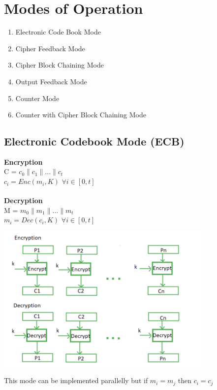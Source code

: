 \documentclass[11pt]{article}
\begin{document}
\section*{Modes of Operation}
\begin{enumerate}
\itemsep-0.5em 
\item Electronic Code Book Mode
\item Cipher Feedback Mode
\item Cipher Block Chaining Mode
\item Output Feedback Mode
\item Counter Mode
\item Counter with Cipher Block Chaining Mode
\end{enumerate}

\subsection*{Electronic Codebook Mode (ECB)}
\textbf{Encryption} \\
C = $c_{0} \| c_{1} \| ... \| c_{t}$ \\
$c_{i} = Enc(m_{i},K)$ \hspace{1cm} $\forall i\in [0,t]$ \\
\\
\textbf{Decryption} \\
M = $m_{0} \| m_{1} \| ... \| m_{t}$ \\
$m_{i} = Dec(c_{i},K)$ \hspace{1cm} $\forall i\in [0,t]$ \\
\begin{center}
\includegraphics[width=300pt]{p1.png} \\  
\end{center}
This mode can be implemented parallelly but if $m_{i} = m_{j}$ then $c_{i} = c_{j}$ 
\end{document}
